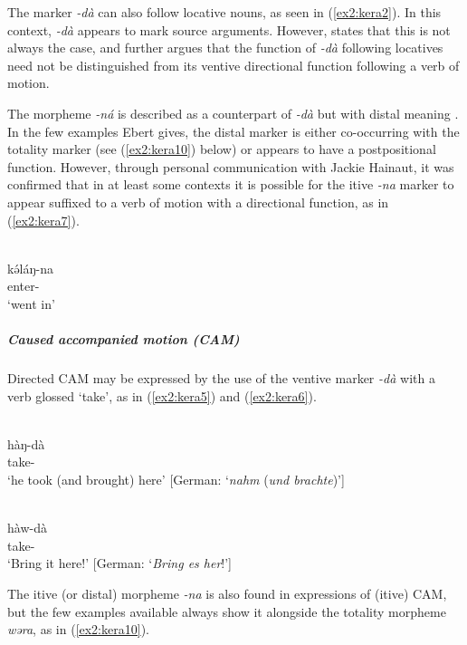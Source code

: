 The marker \textit{-dà} can also follow locative nouns, as seen in (\ref{ex2:kera2}). In this context, \textit{-dà} appears to mark source arguments. However, \citet[114]{ebertSpracheUndTradition1979} states that this is not always the case, and further argues that the function of \textit{-dà} following locatives need not be distinguished from its ventive directional function following a verb of motion.  

The morpheme \textit{-ná} is described as a counterpart of \textit{-dà} but with distal meaning \citep[115]{ebertSpracheUndTradition1979}. In the few examples Ebert gives, the distal marker is either co-occurring with the totality marker (see (\ref{ex2:kera10}) below) or appears to have a postpositional function. However, through personal communication with Jackie Hainaut, it was confirmed that in at least some contexts it is possible for the itive \textit{-na} marker to appear suffixed to a verb of motion with a directional function, as in (\ref{ex2:kera7}). 

\ea\label{ex2:kera7}
 \\
\gll kə́láŋ-na	\\
enter-	\\
\glt `went in'
\z 

\subparagraph{Caused accompanied motion (CAM)}

Directed CAM may be expressed by the use of the ventive marker \textit{-dà} with a verb glossed `take', as in (\ref{ex2:kera5}) and (\ref{ex2:kera6}).

\ea\label{ex2:kera5}
 \\
\gll hàŋ-dà	\\
take-	\\
\glt `he took (and brought) here' [German: `\textit{nahm} (\textit{und brachte})']

\ex\label{ex2:kera6}
 \\
\gll hàw-dà 	\\
take-	\\
\glt `Bring it here!' [German: `\textit{Bring es her}!']
\z 

The itive (or distal) morpheme \textit{-na} is also found in expressions of (itive) CAM, but the few examples available always show it alongside the totality morpheme \textit{wəra}, as in (\ref{ex2:kera10}).

